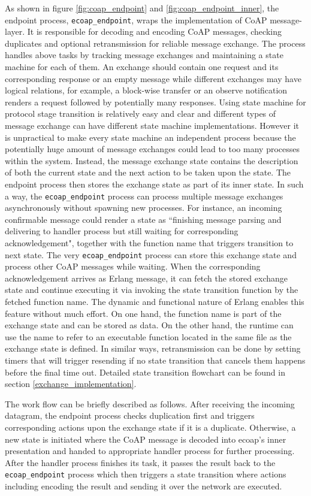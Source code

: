 As shown in figure \ref{fig:coap_endpoint} and \ref{fig:coap_endpoint_inner}, the endpoint process, \verb|ecoap_endpoint|, wraps the implementation of CoAP message-layer. It is responsible for decoding and encoding CoAP messages, checking duplicates and optional retransmission for reliable message exchange. The process handles above tasks by tracking message exchanges and maintaining a state machine for each of them. An exchange should contain one request and its corresponding response or an empty message while different exchanges may have logical relations, for example, a block-wise transfer or an observe notification renders a request followed by potentially many responses. Using state machine for protocol stage transition is relatively easy and clear and different types of message exchange can have different state machine implementations. However it is unpractical to make every state machine an independent process because the potentially huge amount of message exchanges could lead to too many processes within the system. Instead, the message exchange state contains the description of both the current state and the next action to be taken upon the state. The endpoint process then stores the exchange state as part of its inner state. In such a way, the \verb|ecoap_endpoint| process can process multiple message exchanges asynchronously without spawning new processes. For instance, an incoming confirmable message could render a state as ``finishing message parsing and delivering to handler process but still waiting for corresponding acknowledgement", together with the function name that triggers transition to next state. The very \verb|ecoap_endpoint| process can store this exchange state and process other CoAP messages while waiting. When the corresponding acknowledgement arrives as Erlang message, it can fetch the stored exchange state and continue executing it via invoking the state transition function by the fetched function name. The dynamic and functional nature of Erlang enables this feature without much effort. On one hand, the function name is part of the exchange state and can be stored as data. On the other hand, the runtime can use the name to refer to an executable function located in the same file as the exchange state is defined. In similar ways, retransmission can be done by setting timers that will trigger resending if no state transition that cancels them happens before the final time out. Detailed state transition flowchart can be found in section \ref{exchange_implementation}.

The work flow can be briefly described as follows. After receiving the incoming datagram, the endpoint process checks duplication first and triggers corresponding actions upon the exchange state if it is a duplicate. Otherwise, a new state is initiated where the CoAP message is decoded into ecoap's inner presentation and handed to appropriate handler process for further processing. After the handler process finishes its task, it passes the result back to the \verb|ecoap_endpoint| process which then  triggers a state transition where actions including encoding the result and sending it over the network are executed.

